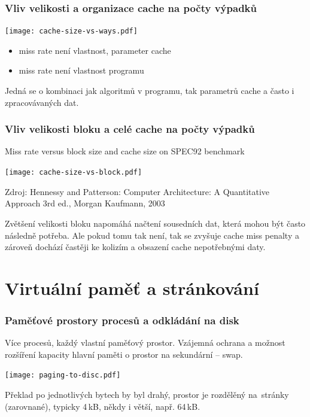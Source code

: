 \documentclass{beamer}
\begin{document}
\begin{frame}
\frametitle{Vliv velikosti a organizace cache na počty výpadků}

{
\centering

\texttt{[image: cache-size-vs-ways.pdf]}

}

\begin{itemize}
\item miss rate není vlastnost, parameter cache
\item miss rate není vlastnost programu
\end{itemize}

Jedná se o kombinaci jak algoritmů v programu, tak parametrů cache a často i zpracovávaných dat.

\end{frame}

\begin{frame}
\frametitle{Vliv velikosti bloku a celé cache na počty výpadků}

Miss rate versus block size and cache size on SPEC92 benchmark

\vskip 2mm

{
\centering

\texttt{[image: cache-size-vs-block.pdf]}

}

\vskip 2mm

{\tiny Zdroj: Hennessy and Patterson: Computer Architecture: A Quantitative Approach 3rd ed., Morgan Kaufmann, 2003}

Zvětšení velikosti bloku napomáhá načtení sousedních dat, která mohou být často následně potřeba.
Ale pokud tomu tak není, tak se zvyšuje cache miss penalty a zároveň dochází častěji ke kolizím
a obsazení cache nepotřebnými daty.

\end{frame}

\section{Virtuální paměť a stránkování}

\begin{frame}
\frametitle{Paměťové prostory procesů a odkládání na disk}

Více procesů, každý vlastní paměťový prostor. Vzájemná ochrana
a možnost rozšíření kapacity hlavní paměti o prostor na sekundární -- swap.

{
\centering

\texttt{[image: paging-to-disc.pdf]}

}

Překlad po jednotlivých bytech by byl drahý, prostor je rozdělěný na~stránky
(zarovnané), typicky 4\,kB, někdy i větší, např. 64\,kB.

\end{frame}
\end{document}
